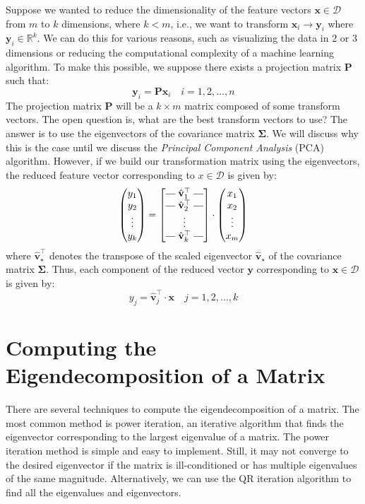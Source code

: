 \documentclass{article}[11pt]
\makeatletter
\newcommand{\brows}[1]{%
  \begin{bmatrix}
  \begin{array}{@{\protect\rotvert\;}c@{\;\protect\rotvert}}
  #1
  \end{array}
  \end{bmatrix}
}
\newcommand{\rotvert}{\rotatebox[origin=c]{90}{$\vert$}}
\newcommand{\rowsvdots}{\multicolumn{1}{@{}c@{}}{\vdots}}
\def\D{\mathcal{D}}
\makeatother
\begin{document}
Suppose we wanted to reduce the dimensionality of the feature vectors $\mathbf{x}\in\D$ from $m$ to $k$ dimensions, where $k<m$, 
i.e., we want to transform $\mathbf{x}_{i}\rightarrow\mathbf{y}_{i}$ where $\mathbf{y}_{i}\in\mathbb{R}^{k}$. 
We can do this for various reasons, such as visualizing the data in $2 $ or $3 $ dimensions or reducing the computational complexity of a machine learning algorithm.
To make this possible, we suppose there exists a projection matrix $\mathbf{P}$ such that:
\begin{equation}
   \mathbf{y}_{i} = \mathbf{P}\mathbf{x}_{i}\quad{i=1,2,\dots,n}
\end{equation}
The projection matrix $\mathbf{P}$ will be a $k\times{m}$ matrix composed of some transform vectors. The open question is, what are the best transform vectors to use? The answer is to use the eigenvectors of the covariance matrix $\mathbf{\Sigma}$.
We will discuss why this is the case until we discuss the \emph{Principal Component Analysis} (PCA) algorithm.
However, if we build our transformation matrix using the eigenvectors, the reduced feature vector corresponding to $x\in\D$ is given by:
\begin{equation}
   \begin{pmatrix}
      y_{1} \\
      y_{2} \\
      \vdots \\
      y_{k}
   \end{pmatrix} = \brows{\hat{\mathbf{v}}_1^\top \\ \hat{\mathbf{v}}_2^\top \\ \rowsvdots \\ \hat{\mathbf{v}}_k^\top}
   \cdot
   \begin{pmatrix}
      x_{1} \\
      x_{2} \\
      \vdots \\
      x_{m}
   \end{pmatrix}
\end{equation}
where $\hat{\mathbf{v}}_{\star}^{\top}$ denotes the transpose of the scaled eigenvector $\hat{\mathbf{v}}_{\star}$ of the covariance matrix $\mathbf{\Sigma}$.
Thus, each component of the reduced vector $\mathbf{y}$ corresponding to $\mathbf{x}\in\D$ is given by:
\begin{equation}
   y_{j} = \hat{\mathbf{v}}_{j}^{\top}\cdot\mathbf{x}\quad{j=1,2,\dots,k}
\end{equation}

\section{Computing the Eigendecomposition of a Matrix}
There are several techniques to compute the eigendecomposition of a matrix. 
The most common method is power iteration, an iterative algorithm that finds the eigenvector corresponding to the largest eigenvalue of a matrix. The power iteration method is simple and easy to implement. Still, it may not converge to the desired eigenvector if the matrix is ill-conditioned or has multiple eigenvalues of the same magnitude.
Alternatively, we can use the QR iteration algorithm to find all the eigenvalues and eigenvectors.
\end{document}
